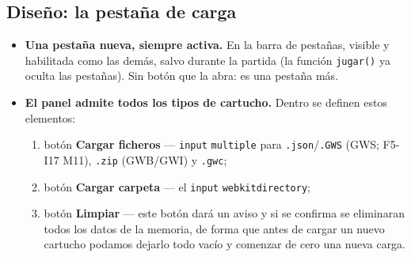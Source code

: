 \subsection{Diseño: la pestaña de carga}
\label{sec:F5I19Diseno}

\begin{itemize}
	\item \textbf{Una pestaña nueva, siempre activa.} En la barra de
	pestañas, visible y habilitada como las demás, salvo durante la partida
	(la función \texttt{jugar()} ya oculta las pestañas). Sin botón que la
	abra: es una pestaña más.
	\item \textbf{El panel admite todos los tipos de cartucho.} Dentro se definen estos elementos:
	\begin{enumerate}
		\item botón \textbf{Cargar ficheros} — \texttt{input} \texttt{multiple} para \texttt{.json}/\texttt{.GWS} (GWS; F5-I17 M11), \texttt{.zip} (GWB/GWI) y \texttt{.gwc}; 

		\item botón \textbf{Cargar carpeta} — el \texttt{input} \texttt{webkitdirectory}; 

		\item botón \textbf{Limpiar} — este botón dará un aviso y si se confirma se eliminaran todos los datos de la memoria, de forma que antes de cargar un nuevo cartucho podamos dejarlo todo vacío y comenzar de cero una nueva carga.


\end{enumerate}
\end{itemize}
